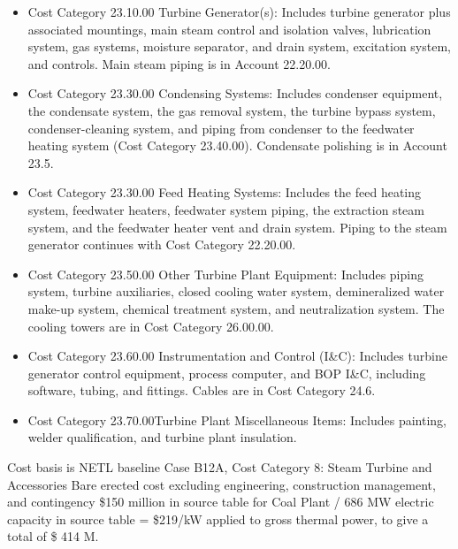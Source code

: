 \begin{itemize}
    \item Cost Category 23.10.00 Turbine Generator(s): Includes turbine generator plus associated mountings, main steam control and isolation valves, lubrication system, gas systems, moisture separator, and drain system, excitation system, and controls. Main steam piping is in Account 22.20.00.
    \item Cost Category 23.30.00 Condensing Systems: Includes condenser equipment, the condensate system, the gas removal system, the turbine bypass system, condenser-cleaning system, and piping from condenser to the feedwater heating system (Cost Category 23.40.00). Condensate polishing is in Account 23.5.
    \item Cost Category 23.30.00 Feed Heating Systems: Includes the feed heating system, feedwater heaters, feedwater system piping, the extraction steam system, and the feedwater heater vent and drain system. Piping to the steam generator continues with Cost Category 22.20.00.
    \item Cost Category 23.50.00 Other Turbine Plant Equipment: Includes piping system, turbine auxiliaries, closed cooling water system, demineralized water make-up system, chemical treatment system, and neutralization system. The cooling towers are in Cost Category 26.00.00.
    \item Cost Category 23.60.00 Instrumentation and Control (I\&C): Includes turbine generator control equipment, process computer, and BOP I\&C, including software, tubing, and fittings. Cables are in Cost Category 24.6.
    \item Cost Category 23.70.00Turbine Plant Miscellaneous Items: Includes painting, welder qualification, and turbine plant insulation.
\end{itemize}

Cost basis is NETL baseline Case B12A, Cost Category 8: Steam Turbine and Accessories Bare erected cost excluding engineering, construction management, and  
contingency \$150 million in source table for Coal Plant / 686 MW electric capacity in source table = \$219/kW applied to gross thermal power, to give a total of \$ 414 M.